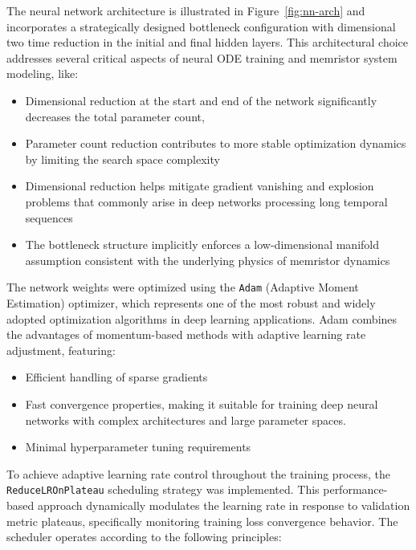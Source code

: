 \documentclass[11pt, oneside]{article}
\begin{document}

The neural network architecture is illustrated in Figure~\ref{fig:nn-arch} and incorporates a strategically designed bottleneck configuration with dimensional two time reduction in the initial and final hidden layers. This architectural choice addresses several critical aspects of neural ODE training and memristor system modeling, like:
\begin{itemize}
    \item Dimensional reduction at the start and end of the network significantly decreases the total parameter count,
    \item  Parameter count reduction contributes to more stable optimization dynamics by limiting the search space complexity
    \item Dimensional reduction helps mitigate gradient vanishing and explosion problems that commonly arise in deep networks processing long temporal sequences
    \item  The bottleneck structure implicitly enforces a low-dimensional manifold assumption consistent with the underlying physics of memristor dynamics
\end{itemize}


The network weights were optimized using the \texttt{Adam} (Adaptive Moment Estimation) optimizer, which represents one of the most robust and widely adopted optimization algorithms in deep learning applications. Adam combines the advantages of momentum-based methods with adaptive learning rate adjustment, featuring:
\begin{itemize}
    \item Efficient handling of sparse gradients
    \item Fast convergence properties, making it suitable for training deep neural networks with complex architectures and large parameter spaces.
    \item Minimal hyperparameter tuning requirements
\end{itemize}



To achieve adaptive learning rate control throughout the training process, the \texttt{ReduceLROnPlateau} scheduling strategy was implemented. This performance-based approach dynamically modulates the learning rate in response to validation metric plateaus, specifically monitoring training loss convergence behavior. The scheduler operates according to the following principles:
\end{document}
